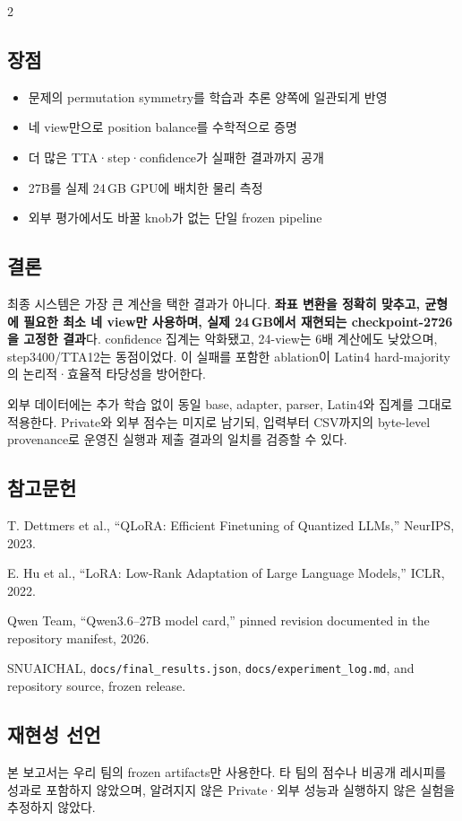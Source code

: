 \documentclass[9pt,a4paper]{extarticle}
\newcommand{\code}[1]{\texttt{\footnotesize #1}}
\newcommand{\tightnote}[1]{{\scriptsize #1}}
\begin{document}
\begin{multicols}{2}
\subsection{장점}

\begin{itemize}
\item 문제의 permutation symmetry를 학습과 추론 양쪽에 일관되게 반영
\item 네 view만으로 position balance를 수학적으로 증명
\item 더 많은 TTA·step·confidence가 실패한 결과까지 공개
\item 27B를 실제 24\,GB GPU에 배치한 물리 측정
\item 외부 평가에서도 바꿀 knob가 없는 단일 frozen pipeline
\end{itemize}

\subsection{결론}

최종 시스템은 가장 큰 계산을 택한 결과가 아니다.
\textbf{좌표 변환을 정확히 맞추고, 균형에 필요한 최소 네 view만 사용하며,
실제 24\,GB에서 재현되는 checkpoint-2726을 고정한 결과}다.
confidence 집계는 악화됐고, 24-view는 6배 계산에도 낮았으며, step3400/TTA12는
동점이었다. 이 실패를 포함한 ablation이 Latin4 hard-majority의 논리적·효율적
타당성을 방어한다.

외부 데이터에는 추가 학습 없이 동일 base, adapter, parser, Latin4와 집계를
그대로 적용한다. Private와 외부 점수는 미지로 남기되, 입력부터 CSV까지의
byte-level provenance로 운영진 실행과 제출 결과의 일치를 검증할 수 있다.

\subsection{참고문헌}
\scriptsize
\begin{enumerate}[label={[\arabic*]},leftmargin=1.7em]
\item T. Dettmers et al., ``QLoRA: Efficient Finetuning of Quantized LLMs,''
NeurIPS, 2023.
\item E. Hu et al., ``LoRA: Low-Rank Adaptation of Large Language Models,''
ICLR, 2022.
\item Qwen Team, ``Qwen3.6--27B model card,'' pinned revision documented in
the repository manifest, 2026.
\item SNUAICHAL, \code{docs/final\_results.json},
\code{docs/experiment\_log.md}, and repository source, frozen release.
\end{enumerate}
\normalsize

\subsection*{재현성 선언}
\tightnote{본 보고서는 우리 팀의 frozen artifacts만 사용한다. 타 팀의 점수나
비공개 레시피를 성과로 포함하지 않았으며, 알려지지 않은 Private·외부 성능과
실행하지 않은 실험을 추정하지 않았다.}
\end{multicols}
\end{document}
